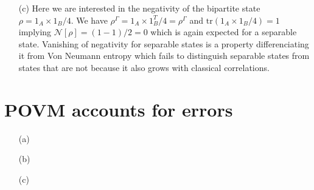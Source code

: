 \documentclass[10pt, a4paper]{article}
\begin{document}
{\begin{enumerate}
\begin{align*}
    \frac{1}{2}
    \begin{pmatrix}
      1 & 0 & 0 & 0\\
      0 & 0 & 1 & 0\\
      0 & 1 & 0 & 0\\
      0 & 0 & 0 & 1
    \end{pmatrix}
    \frac{1}{2}
    \begin{pmatrix}
      1 & 0 & 0 & 0\\
      0 & 0 & 1 & 0\\
      0 & 1 & 0 & 0\\
      0 & 0 & 0 & 1
    \end{pmatrix}
    \right)^{1/2}\right)
    =
    \frac{1}{2}\text{tr}\left(
    \begin{pmatrix}
      1 & 0 & 0 & 0\\
      0 & 1 & 0 & 0\\
      0 & 0 & 1 & 0\\
      0 & 0 & 0 & 1
    \end{pmatrix}^{1/2}\right) = 2
  \end{align*}
  leading to a negativity $\mathcal{N}[\rho] = (2-1)/2 = 1/2$ which is half of the concurrence calculated for the same state in (a) as expected of a two-qubit system. Repeating the calculation for the state $\rho = \ket{00}\bra{00}$, we find $\rho^\Gamma = \rho$ and $\text{tr}(\sqrt{\ket{00}\bra{00} (\ket{00}\bra{00})^{\dagger}}) = 1  + 0 \times 3$ leading to the negativity $\mathcal{N}[\rho] = (1-1)/2 = 0$ as expected for a separable state. 
  \item[(c)] Here we are interested in the negativity of the bipartite state $\rho = 1_A \times 1_B/4$. We have $\rho^\Gamma = 1_A \times 1_B^T/4 = \rho^\Gamma$ and $\text{tr}(1_A \times 1_B/4) = 1$ implying $\mathcal{N}[\rho] = (1-1)/2 = 0$ which is again expected for a separable state. Vanishing of negativity for separable states is a property differenciating it from Von Neumann entropy which fails to distinguish separable states from states that are not because it also grows with classical correlations. 
\end{enumerate}

\section{POVM accounts for errors}

\begin{enumerate}
  \item[(a)]
  \item[(b)]
  \item[(c)]  
\end{enumerate}

}
\end{document}
